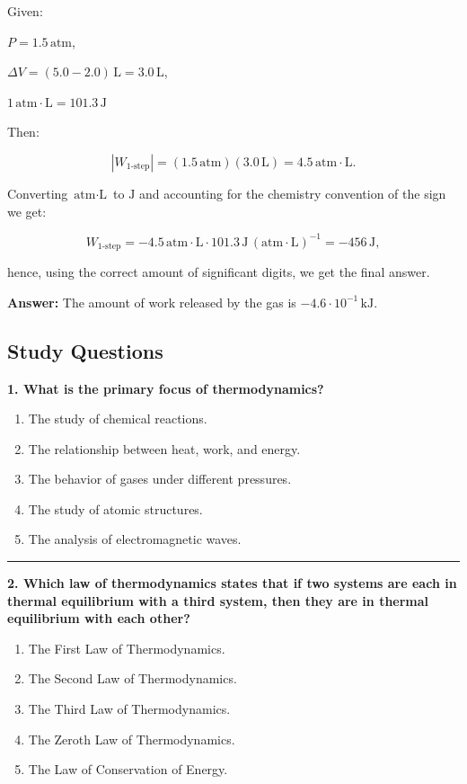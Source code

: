 \documentclass[
  9pt,
]{extbook}
\providecommand{\tightlist}{%
  \setlength{\itemsep}{0pt}\setlength{\parskip}{0pt}}
\theoremstyle{definition}
\theoremstyle{definition}
\theoremstyle{definition}
\theoremstyle{definition}
\theoremstyle{remark}
\begin{document}
Given:

\(P=1.5\,\text{atm}\),

\(\Delta V =(5.0-2.0)\,\text{L}=3.0\,\text{L}\),

\(1 \, \text{atm}\cdotp\text{L}=101.3\,\text{J}\)

Then:

\[\left| W_{\text{1-step}} \right|=(1.5\,\text{atm})(3.0\,\text{L}) = 4.5\,\text{atm}\cdotp \text{L}.\]

Converting \(\text{atm}\cdot\text{L}\) to \(\text{J}\) and accounting for the chemistry convention of the sign we get:

\[W_{\text{1-step}}= -4.5\,\text{atm}\cdotp \text{L} \cdot 101.3 \,\text{J}\,(\text{atm}\cdotp\text{L})^{-1} = -456\,\text{J},\]

hence, using the correct amount of significant digits, we get the final answer.

\textbf{Answer:} The amount of work released by the gas is \(-4.6 \cdot 10^{-1}\,\text{kJ}\).

\subsection{Study Questions}\label{quest2}

\textbf{1. What is the primary focus of thermodynamics?}

\begin{enumerate}
\def\labelenumi{\alph{enumi}.}
\tightlist
\item
  The study of chemical reactions.
\item
  The relationship between heat, work, and energy.
\item
  The behavior of gases under different pressures.
\item
  The study of atomic structures.
\item
  The analysis of electromagnetic waves.
\end{enumerate}

\begin{center}\rule{0.5\linewidth}{0.5pt}\end{center}

\textbf{2. Which law of thermodynamics states that if two systems are each in thermal equilibrium with a third system, then they are in thermal equilibrium with each other?}

\begin{enumerate}
\def\labelenumi{\alph{enumi}.}
\tightlist
\item
  The First Law of Thermodynamics.
\item
  The Second Law of Thermodynamics.
\item
  The Third Law of Thermodynamics.
\item
  The Zeroth Law of Thermodynamics.
\item
  The Law of Conservation of Energy.
\end{enumerate}
\end{document}
